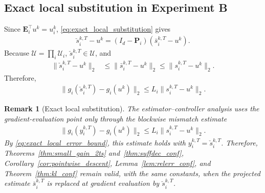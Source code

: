 \documentclass[letterpaper, 10 pt, conference]{ieeeconf} %
\newtheorem{remark}{Remark}
\begin{document}
\subsection{Exact local substitution in Experiment B}
Since \(\mathbf E_i^\top u^k=u_i^k\), \eqref{eq:exact_local_substitution} gives
\begin{align}
\check s_i^{k,T}-u^k
=
(I_d-\mathbf P_i)
(\bar s_i^{k,T}-u^k).
\end{align}
Because \(\mathcal U=\prod_i\mathcal U_i\), \(\check s_i^{k,T}\in\mathcal U\), and
\begin{align}
\|\check s_i^{k,T}-u^k\|_2
&\le
\|\bar s_i^{k,T}-u^k\|_2
\le
\|s_i^{k,T}-u^k\|_2.
\label{eq:exact_local_error_bound}
\end{align}
Therefore,
\begin{align}
\|g_i(\check s_i^{k,T})-g_i(u^k)\|_2
\le
L_i\|s_i^{k,T}-u^k\|_2.
\end{align}
\begin{remark}[Exact local substitution]
\label{rem:exact_local_substitution}
The estimator--controller analysis uses the gradient-evaluation point only through the blockwise mismatch estimate
\begin{align}
\|g_i(y_i^{k,T})-g_i(u^k)\|_2
\le
L_i\|s_i^{k,T}-u^k\|_2.
\end{align}
By \eqref{eq:exact_local_error_bound}, this estimate holds with \(y_i^{k,T}=\check s_i^{k,T}\). Therefore, Theorems~\ref{thm:small_gain_2ts} and~\ref{thm:suffdec_conf}, Corollary~\ref{cor:pointwise_descent}, Lemma~\ref{lem:relerr_conf}, and Theorem~\ref{thm:kl_conf} remain valid, with the same constants, when the projected estimate \(\bar s_i^{k,T}\) is replaced at gradient evaluation by \(\check s_i^{k,T}\).
\end{remark}
\end{document}
